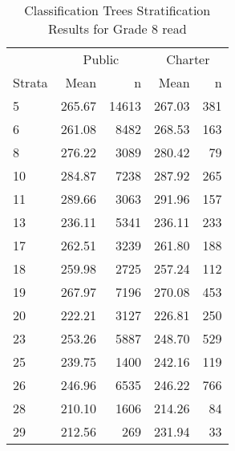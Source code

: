 \begin{table}[ht]
\centering
\caption{Classification Trees Stratification Results for Grade 8 read} 
\label{g8read-circpsa-tree}
\begin{tabular}{lrr@{\extracolsep{.2cm}}rr}
  \hline
   & \multicolumn{2}{c}{Public} & \multicolumn{2}{c}{Charter} \\ \cline{2-3} \cline{4-5} Strata & Mean & n & Mean & n \\ \hline
5 & 265.67 & 14613 & 267.03 & 381 \\ 
  6 & 261.08 & 8482 & 268.53 & 163 \\ 
  8 & 276.22 & 3089 & 280.42 &  79 \\ 
  10 & 284.87 & 7238 & 287.92 & 265 \\ 
  11 & 289.66 & 3063 & 291.96 & 157 \\ 
  13 & 236.11 & 5341 & 236.11 & 233 \\ 
  17 & 262.51 & 3239 & 261.80 & 188 \\ 
  18 & 259.98 & 2725 & 257.24 & 112 \\ 
  19 & 267.97 & 7196 & 270.08 & 453 \\ 
  20 & 222.21 & 3127 & 226.81 & 250 \\ 
  23 & 253.26 & 5887 & 248.70 & 529 \\ 
  25 & 239.75 & 1400 & 242.16 & 119 \\ 
  26 & 246.96 & 6535 & 246.22 & 766 \\ 
  28 & 210.10 & 1606 & 214.26 &  84 \\ 
  29 & 212.56 & 269 & 231.94 &  33 \\ 
   \hline
\end{tabular}
\end{table}
